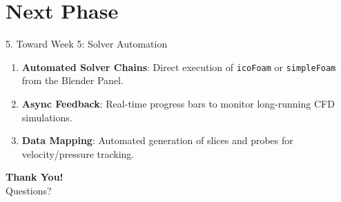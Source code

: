 \documentclass[dvipsnames,mathserif]{beamer}
\begin{document}
\section{Next Phase}
\begin{frame}{5. Toward Week 5: Solver Automation}
    \begin{enumerate}
        \item \textbf{Automated Solver Chains}: Direct execution of \texttt{icoFoam} or \texttt{simpleFoam} from the Blender Panel.
        \item \textbf{Async Feedback}: Real-time progress bars to monitor long-running CFD simulations.
        \item \textbf{Data Mapping}: Automated generation of slices and probes for velocity/pressure tracking.
    \end{enumerate}
\end{frame}

\begin{frame}
    \begin{center}
        \Huge \textbf{Thank You!} \\
        \vspace{0.5cm}
        \large Questions?
    \end{center}
\end{frame}
\end{document}
